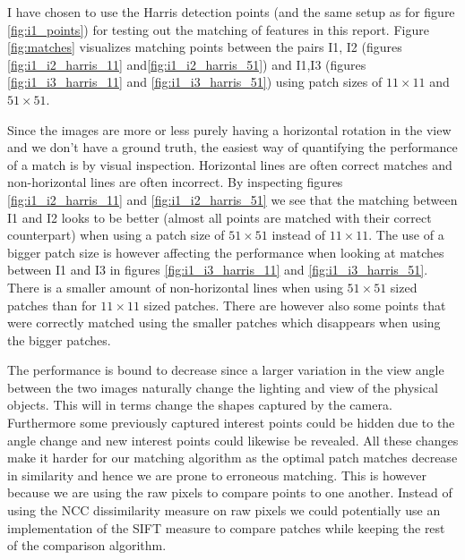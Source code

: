 \documentclass[11pt,a4paper]{article}
\begin{document}
I have chosen to use the Harris detection points (and the same setup as for
figure \ref{fig:i1_points}) for testing out the matching of features in this
report. Figure \ref{fig:matches} visualizes matching points between the pairs
I1, I2 (figures \ref{fig:i1_i2_harris_11} and\ref{fig:i1_i2_harris_51}) and
I1,I3 (figures \ref{fig:i1_i3_harris_11} and \ref{fig:i1_i3_harris_51}) using
patch sizes of $11\times11$ and $51\times51$.

Since the images are more or less purely having a horizontal rotation in the
view and we don't have a ground truth, the easiest way of quantifying the
performance of a match is by visual inspection. Horizontal lines are often
correct matches and non-horizontal lines are often incorrect. By inspecting
figures \ref{fig:i1_i2_harris_11} and \ref{fig:i1_i2_harris_51} we see that the
matching between I1 and I2 looks to be better (almost all points are matched
with their correct counterpart) when using a patch size of
$51\times51$ instead of $11\times11$. The use of a bigger patch size is however
affecting the performance when looking at matches between I1 and I3 in figures
\ref{fig:i1_i3_harris_11} and \ref{fig:i1_i3_harris_51}. There is a smaller
amount of non-horizontal lines when using $51\times51$ sized patches than for
$11\times11$ sized patches. There are however also some points that were
correctly matched using the smaller patches which disappears when using the
bigger patches.

The performance is bound to decrease since a larger variation in the view angle between
the two images naturally change the lighting and view of the physical objects.
This will in terms change the shapes captured by the camera. Furthermore some
previously captured interest points could be hidden due to the angle change
and new interest points could likewise be revealed. All these changes make it
harder for our matching algorithm as the optimal patch matches decrease in
similarity and hence we are prone to erroneous matching. This is however because
we are using the raw pixels to compare points to one another. Instead of using the
NCC dissimilarity measure on raw pixels we could potentially use an
implementation of the SIFT measure to compare patches while keeping the rest of
the comparison algorithm.
\end{document}
